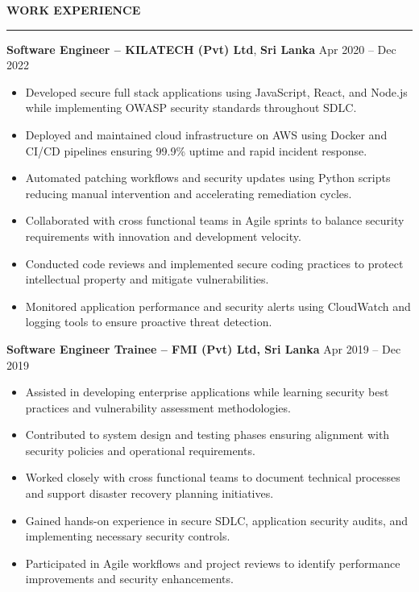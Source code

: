 \documentclass[10pt,letterpaper]{article}
\begin{document}
\textbf{WORK EXPERIENCE}\\[-8pt]
\noindent\rule{\textwidth}{1pt}

\vspace{-2pt}

\textbf{Software Engineer -- KILATECH (Pvt) Ltd}, \textbf{Sri Lanka} \hfill Apr 2020 -- Dec 2022

\vspace{-1pt}

\begin{itemize}
\item Developed secure full stack applications using JavaScript, React, and Node.js while implementing OWASP security standards throughout SDLC.
\item Deployed and maintained cloud infrastructure on AWS using Docker and CI/CD pipelines ensuring 99.9\% uptime and rapid incident response.
\item Automated patching workflows and security updates using Python scripts reducing manual intervention and accelerating remediation cycles.
\item Collaborated with cross functional teams in Agile sprints to balance security requirements with innovation and development velocity.
\item Conducted code reviews and implemented secure coding practices to protect intellectual property and mitigate vulnerabilities.
\item Monitored application performance and security alerts using CloudWatch and logging tools to ensure proactive threat detection.
\end{itemize}

\textbf{Software Engineer Trainee -- FMI (Pvt) Ltd, Sri Lanka} \hfill Apr 2019 -- Dec 2019

\vspace{-1pt}

\begin{itemize}
\item Assisted in developing enterprise applications while learning security best practices and vulnerability assessment methodologies.
\item Contributed to system design and testing phases ensuring alignment with security policies and operational requirements.
\item Worked closely with cross functional teams to document technical processes and support disaster recovery planning initiatives.
\item Gained hands-on experience in secure SDLC, application security audits, and implementing necessary security controls.
\item Participated in Agile workflows and project reviews to identify performance improvements and security enhancements.
\end{itemize}
\end{document}

